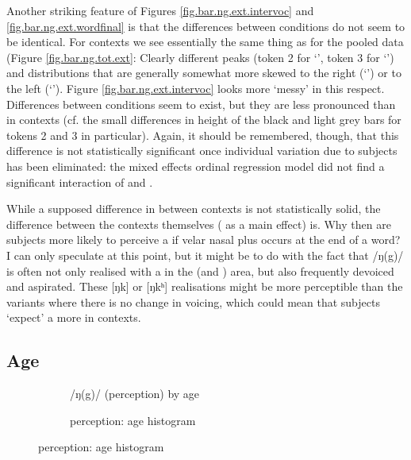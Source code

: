 Another striking feature of Figures \ref{fig.bar.ng.ext.intervoc} and \ref{fig.bar.ng.ext.wordfinal} is that the differences between  conditions do not seem to be identical.
For  contexts we see essentially the same thing as for the pooled data (Figure \ref{fig.bar.ng.tot.ext}: Clearly different peaks (token 2 for `', token 3 for `') and distributions that are generally somewhat more skewed to the right (`') or to the left (`').
Figure \ref{fig.bar.ng.ext.intervoc} looks more `messy' in this respect.
Differences between  conditions seem to exist, but they are less pronounced than in  contexts (cf. the small differences in height of the black and light grey bars for tokens 2 and 3 in particular).
Again, it should be remembered, though, that this difference is not statistically significant once individual variation due to subjects has been eliminated: the mixed effects ordinal regression model did not find a significant interaction of  and .

While a supposed difference in  between contexts is not statistically solid, the difference between the contexts themselves ( as a main effect) is.
Why then are subjects more likely to perceive a  if velar nasal plus occurs at the end of a word?
I can only speculate at this point, but it might be to do with the fact that  /ŋ(g)/ is often not only realised with a  in the  (and ) area, but also frequently devoiced and aspirated.
These [ŋk] or [ŋkʰ] realisations might be more perceptible than the  variants where there is no change in voicing, which could mean that subjects `expect' a  more in  contexts.

\subsection{Age}
\label{sec.perc_res.ng.age}

\begin{figure}[h]
	\centering
	\begin{subfigure}{.49\textwidth}
		\centering
			\resizebox{\linewidth}{!}{} 
		\caption{/ŋ(g)/ (perception)  by age}
		\label{fig.scatter.ng.ext.age}
	\end{subfigure}
	\begin{subfigure}{.49\textwidth}
		\centering
			\resizebox{\linewidth}{!}{} 
		\caption{perception: age histogram}
		\label{fig.hist.ext.age}
	\end{subfigure}			
\end{figure}

